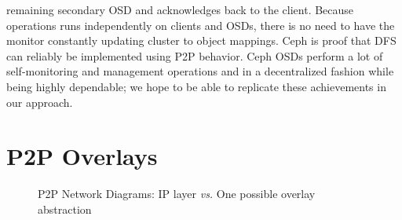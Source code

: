 \documentclass[runningheads]{llncs}
\begin{document}
remaining secondary OSD and acknowledges back to the client. Because operations runs independently on clients and OSDs, there is no need to have the monitor constantly updating cluster to object mappings. Ceph is proof that DFS can reliably be implemented using P2P behavior. Ceph OSDs perform a lot of self-monitoring and management operations and in a decentralized fashion while being highly dependable\cite{ceph_benchmarks}; we hope to be able to replicate these achievements in our approach.

\section{P2P Overlays}\label{sec:p2p-overlays}

\begin{figure}[t]
    \centering
    \hspace{0.2\textwidth}
    \caption{P2P Network Diagrams: IP layer \textit{vs.} One possible overlay abstraction}
    \label{fig:network_diagrams}
\end{figure}
\end{document}
